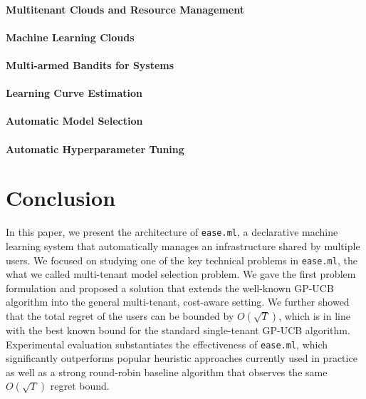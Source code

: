 \documentclass[letterpaper]{vldb}
\newcommand{\eml}{\texttt{ease.ml}\xspace}
\begin{document}
\paragraph*{Multitenant Clouds and Resource Management}

\paragraph*{Machine Learning Clouds}

\paragraph*{Multi-armed Bandits for Systems}

\paragraph*{Learning Curve Estimation}

\paragraph*{Automatic Model Selection}

\paragraph*{Automatic Hyperparameter Tuning}



\section{Conclusion}\label{sec:conclusion}

In this paper, we present the architecture of \eml, a declarative machine learning system that automatically manages an infrastructure shared by multiple users.
We focused on studying one of the key technical problems in \eml, the what we called multi-tenant model selection problem.
We gave the first problem formulation and proposed a solution that extends the well-known GP-UCB algorithm into the general multi-tenant, cost-aware setting.
We further showed that the total regret of the users can be bounded by $O(\sqrt{T})$, which is in line with the best known bound for the standard single-tenant GP-UCB algorithm.
Experimental evaluation substantiates the effectiveness of \eml, which significantly outperforms popular heuristic approaches currently used in practice as well as a strong round-robin baseline algorithm that observes the same $O(\sqrt{T})$ regret bound.
\end{document}
